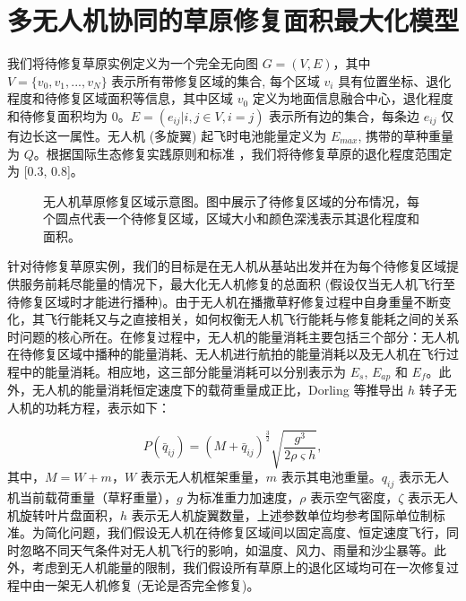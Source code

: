\documentclass[AutoFakeBold]{LZUThesis}
\begin{document}


\chapter{多无人机协同的草原修复面积最大化模型}

我们将待修复草原实例定义为一个完全无向图 $G = (V, E)$，其中 $V = \{v_0, v_1, ..., v_N \}$ 表示所有带修复区域的集合, 每个区域 $v_i$ 具有位置坐标、退化程度和待修复区域面积等信息，其中区域 $v_0$ 定义为地面信息融合中心，退化程度和待修复面积均为 0。$E = (e_{ij} |i, j \in V, i = j)$ 表示所有边的集合，每条边 $e_{ij}$ 仅有边长这一属性。无人机 (多旋翼) 起飞时电池能量定义为 $E_{max}$, 携带的草种重量为 $Q$。根据国际生态修复实践原则和标准\cite{gann2019international} ，我们将待修复草原的退化程度范围定为 [0.3, 0.8]。

\begin{figure}[htbp]
	\centering
	
	\caption{无人机草原修复区域示意图。图中展示了待修复区域的分布情况，每个圆点代表一个待修复区域，区域大小和颜色深浅表示其退化程度和面积。}
	\label{fig:restored-areas}
\end{figure}

针对待修复草原实例，我们的目标是在无人机从基站出发并在为每个待修复区域提供服务前耗尽能量的情况下，最大化无人机修复的总面积 (假设仅当无人机飞行至待修复区域时才能进行播种)。由于无人机在播撒草籽修复过程中自身重量不断变化，其飞行能耗又与之直接相关，如何权衡无人机飞行能耗与修复能耗之间的关系时问题的核心所在。在修复过程中，无人机的能量消耗主要包括三个部分：无人机在待修复区域中播种的能量消耗、无人机进行航拍的能量消耗以及无人机在飞行过程中的能量消耗。相应地，这三部分能量消耗可以分别表示为 $E_s$, $E_{ap}$ 和 $E_f$。此外，无人机的能量消耗恒定速度下的载荷重量成正比，Dorling\cite{dorling2016vehicle} 等推导出 $h$ 转子无人机的功耗方程，表示如下：


\begin{equation} \label{approximation-power-consumption}
	P(\bar{q}_{ij}) = (M + \bar{q}_{ij})^{\frac{3}{2}}\sqrt{\frac{g^3}{2 \rho \varsigma h}},
\end{equation}
其中，$M = W + m$，$W$ 表示无人机框架重量，$m$ 表示其电池重量。$q_{ij}$ 表示无人机当前载荷重量（草籽重量），$g$ 为标准重力加速度，$\rho$ 表示空气密度，$\zeta$ 表示无人机旋转叶片盘面积，$h$ 表示无人机旋翼数量，上述参数单位均参考国际单位制标准。为简化问题，我们假设无人机在待修复区域间以固定高度、恒定速度飞行，同时忽略不同天气条件对无人机飞行的影响，如温度、风力、雨量和沙尘暴等。此外，考虑到无人机能量的限制，我们假设所有草原上的退化区域均可在一次修复过程中由一架无人机修复 (无论是否完全修复)。
\end{document}
